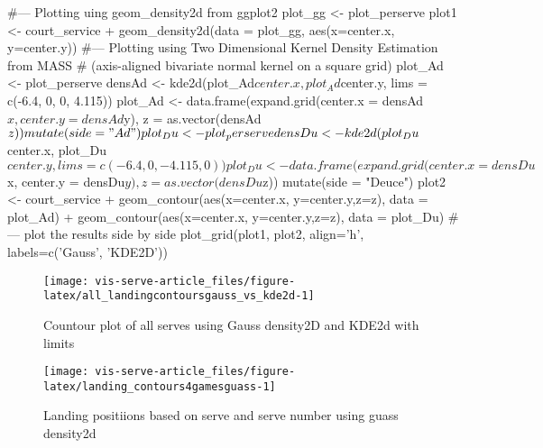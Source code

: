 \documentclass[article]{jss}
\begin{document}
\begin{CodeChunk}
\begin{CodeInput}
#--- Plotting uing geom_density2d from ggplot2
plot_gg <- plot_perserve %
plot1 <- court_service + 
    geom_density2d(data = plot_gg, aes(x=center.x, y=center.y))
#--- Plotting using Two Dimensional Kernel Density Estimation from MASS 
#    (axis-aligned bivariate normal kernel on a square grid)
plot_Ad <- plot_perserve %
densAd <- kde2d(plot_Ad$center.x, plot_Ad$center.y, 
              lims = c(-6.4, 0, 0, 4.115))
plot_Ad <- data.frame(expand.grid(center.x = densAd$x, center.y = densAd$y),
                     z = as.vector(densAd$z)) %
              mutate(side = "Ad")
plot_Du <- plot_perserve %
densDu <- kde2d(plot_Du$center.x, plot_Du$center.y, 
              lims = c(-6.4, 0, -4.115, 0))
plot_Du <- data.frame(expand.grid(center.x = densDu$x, center.y = densDu$y),
                     z = as.vector(densDu$z)) %
              mutate(side = "Deuce")
plot2 <- court_service + 
  geom_contour(aes(x=center.x, y=center.y,z=z), data = plot_Ad) +
  geom_contour(aes(x=center.x, y=center.y,z=z), data = plot_Du)
#--- plot the results side by side
plot_grid(plot1, plot2, align='h', labels=c('Gauss', 'KDE2D'))
\end{CodeInput}
\begin{figure}

{\centering \texttt{[image: vis-serve-article\_files/figure-latex/all\_landingcontoursgauss\_vs\_kde2d-1]} 

}

\caption[Countour plot of all serves using Gauss density2D and KDE2d with limits]{Countour plot of all serves using Gauss density2D and KDE2d with limits}\label{fig:all_landingcontoursgauss_vs_kde2d}
\end{figure}
\end{CodeChunk}

\begin{CodeChunk}
\begin{figure}

{\centering \texttt{[image: vis-serve-article\_files/figure-latex/landing\_contours4gamesguass-1]} 

}

\caption[Landing positiions based on serve and serve number using guass density2d]{Landing positiions based on serve and serve number using guass density2d}\label{fig:landing_contours4gamesguass}
\end{figure}
\end{CodeChunk}
\end{document}
